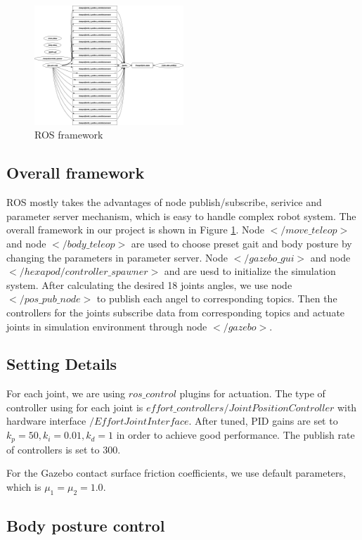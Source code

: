 \documentclass[conference]{IEEEtran}
\begin{document}
\begin{figure}
    \centerline{\includegraphics[width=0.5\textwidth]{rosgraph.png}}
    \caption{ROS framework}
    \label{fig11}
\end{figure}

\subsection{Overall framework}
ROS mostly takes the advantages of node publish/subscribe, serivice and parameter server mechanism, which is easy to handle complex robot system. The overall framework in our project is shown in Figure \ref{fig11}. Node \(</move\_teleop>\) and node \(</body\_teleop>\) are used to choose preset gait and body posture by changing the parameters in parameter server. Node \(</gazebo\_gui>\) and node \(</hexapod/controller\_spawner>\) and are uesd to initialize the simulation system. After calculating the desired 18 joints angles, we use node \(</pos\_pub\_node>\) to publish each angel to corresponding topics. Then the controllers for the joints subscribe data from corresponding topics and actuate joints in simulation environment through node \(</gazebo>\).
\subsection{Setting Details}

For each joint, we are using \(ros\_control\) plugins for actuation. The type of controller using for each joint is \(effort\_controllers/JointPositionController\) with hardware interface \(/EffortJointInterface\). After tuned, PID gains are set to \(k_p = 50, k_i = 0.01, k_d=1\) in order to achieve good performance. The publish rate of controllers is set to \(300\).  

For the Gazebo contact surface friction coefficients, we use default parameters, which is \(\mu_1 = \mu _2 = 1.0\).

\subsection{Body posture control}
\end{document}
